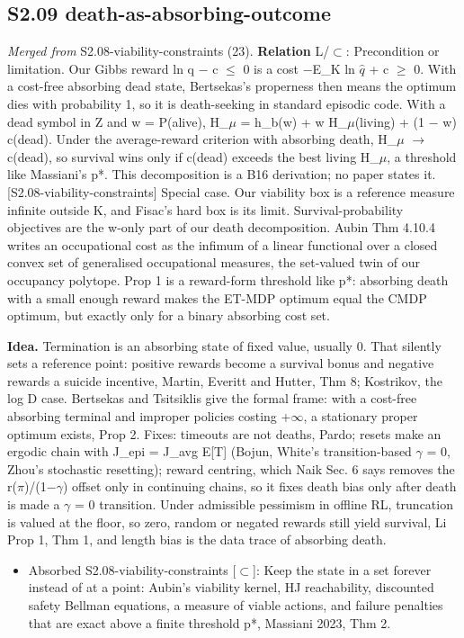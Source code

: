 \documentclass[10pt]{article}
\begin{document}
\subsection{S2.09 death-as-absorbing-outcome}\label{node:S2-S2-09-death-as-absorbing-outcome}
\textit{Merged from} S2.08-viability-constraints (23). \textbf{Relation} \textsf{L}/$\subset$: Precondition or limitation. Our Gibbs reward ln q \ensuremath{-} c \ensuremath{\leq} 0 is a cost \ensuremath{-}E\_K ln \ensuremath{\hat{q}} + c \ensuremath{\geq} 0. With a cost-free absorbing dead state, Bertsekas's properness then means the optimum dies with probability 1, so it is death-seeking in standard episodic code. With a dead symbol in Z and w = P(alive), H\_\ensuremath{\mu} = h\_b(w) + w H\_\ensuremath{\mu}(living) + (1 \ensuremath{-} w) c(dead). Under the average-reward criterion with absorbing death, H\_\ensuremath{\mu} \ensuremath{\to} c(dead), so survival wins only if c(dead) exceeds the best living H\_\ensuremath{\mu}, a threshold like Massiani's p*. This decomposition is a B16 derivation; no paper states it. [S2.08-viability-constraints] Special case. Our viability box is a reference measure infinite outside K, and Fisac's hard box is its limit. Survival-probability objectives are the w-only part of our death decomposition. Aubin Thm 4.10.4 writes an occupational cost as the infimum of a linear functional over a closed convex set of generalised occupational measures, the set-valued twin of our occupancy polytope. \citet{Sun-safe21} Prop 1 is a reward-form threshold like p*: absorbing death with a small enough reward makes the ET-MDP optimum equal the CMDP optimum, but exactly only for a binary absorbing cost set.

\textbf{Idea.} Termination is an absorbing state of fixed value, usually 0. That silently sets a reference point: positive rewards become a survival bonus and negative rewards a suicide incentive, Martin, Everitt and Hutter, Thm 8; Kostrikov, the log D case. Bertsekas and Tsitsiklis give the formal frame: with a cost-free absorbing terminal and improper policies costing +\ensuremath{\infty}, a stationary proper optimum exists, Prop 2. Fixes: timeouts are not deaths, Pardo; resets make an ergodic chain with J\_epi = J\_avg E[T] (Bojun, White's transition-based \ensuremath{\gamma} = 0, Zhou's stochastic resetting); reward centring, which Naik Sec. 6 says removes the r(\ensuremath{\pi})/(1\ensuremath{-}\ensuremath{\gamma}) offset only in continuing chains, so it fixes death bias only after death is made a \ensuremath{\gamma} = 0 transition. Under admissible pessimism in offline RL, truncation is valued at the floor, so zero, random or negated rewards still yield survival, Li Prop 1, Thm 1, and length bias is the data trace of absorbing death.
\begin{itemize}[nosep,leftmargin=1.2em]
\item Absorbed S2.08-viability-constraints [\ensuremath{\subset}]: Keep the state in a set forever instead of at a point: Aubin's viability kernel, HJ reachability, discounted safety Bellman equations, a measure of viable actions, and failure penalties that are exact above a finite threshold p*, Massiani 2023, Thm 2.
\end{itemize}
\end{document}
